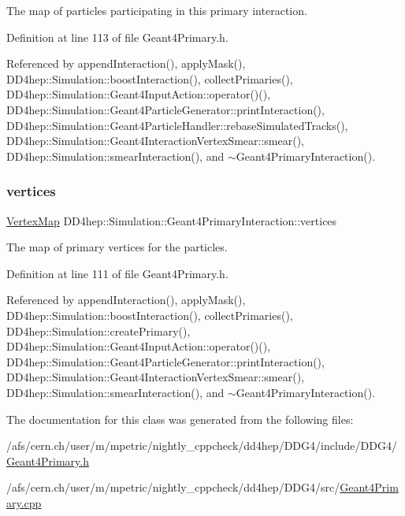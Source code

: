 The map of particles participating in this primary interaction. 



Definition at line 113 of file Geant4\+Primary.\+h.



Referenced by append\+Interaction(), apply\+Mask(), D\+D4hep\+::\+Simulation\+::boost\+Interaction(), collect\+Primaries(), D\+D4hep\+::\+Simulation\+::\+Geant4\+Input\+Action\+::operator()(), D\+D4hep\+::\+Simulation\+::\+Geant4\+Particle\+Generator\+::print\+Interaction(), D\+D4hep\+::\+Simulation\+::\+Geant4\+Particle\+Handler\+::rebase\+Simulated\+Tracks(), D\+D4hep\+::\+Simulation\+::\+Geant4\+Interaction\+Vertex\+Smear\+::smear(), D\+D4hep\+::\+Simulation\+::smear\+Interaction(), and $\sim$\+Geant4\+Primary\+Interaction().

\hypertarget{class_d_d4hep_1_1_simulation_1_1_geant4_primary_interaction_aea4d776147c0e3d0503ee03de54932af}{}\label{class_d_d4hep_1_1_simulation_1_1_geant4_primary_interaction_aea4d776147c0e3d0503ee03de54932af} 
\subsubsection{\texorpdfstring{vertices}{vertices}}
{\footnotesize\ttfamily \hyperlink{class_d_d4hep_1_1_simulation_1_1_geant4_primary_interaction_a0016a8298291af16ea8f24a054cb864c}{Vertex\+Map} D\+D4hep\+::\+Simulation\+::\+Geant4\+Primary\+Interaction\+::vertices}



The map of primary vertices for the particles. 



Definition at line 111 of file Geant4\+Primary.\+h.



Referenced by append\+Interaction(), apply\+Mask(), D\+D4hep\+::\+Simulation\+::boost\+Interaction(), collect\+Primaries(), D\+D4hep\+::\+Simulation\+::create\+Primary(), D\+D4hep\+::\+Simulation\+::\+Geant4\+Input\+Action\+::operator()(), D\+D4hep\+::\+Simulation\+::\+Geant4\+Particle\+Generator\+::print\+Interaction(), D\+D4hep\+::\+Simulation\+::\+Geant4\+Interaction\+Vertex\+Smear\+::smear(), D\+D4hep\+::\+Simulation\+::smear\+Interaction(), and $\sim$\+Geant4\+Primary\+Interaction().



The documentation for this class was generated from the following files\+:\begin{DoxyCompactItemize}
\item 
/afs/cern.\+ch/user/m/mpetric/nightly\+\_\+cppcheck/dd4hep/\+D\+D\+G4/include/\+D\+D\+G4/\hyperlink{_geant4_primary_8h}{Geant4\+Primary.\+h}\item 
/afs/cern.\+ch/user/m/mpetric/nightly\+\_\+cppcheck/dd4hep/\+D\+D\+G4/src/\hyperlink{_geant4_primary_8cpp}{Geant4\+Primary.\+cpp}\end{DoxyCompactItemize}
